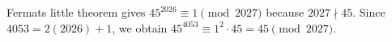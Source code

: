 Fermat\textquotesingle s little theorem gives $45^{2026}\equiv1\pmod{2027}$ because $2027\nmid45$. Since $4053=2(2026)+1$, we obtain $45^{4053}\equiv1^2\cdot45=\boxed{45}\pmod{2027}$.
